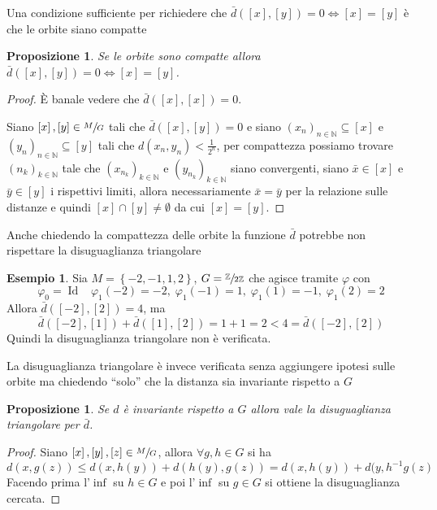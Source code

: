 \documentclass[a4paper,10pt]{article}
\newcounter{counter1}
\theoremstyle{plain}
\newtheorem{mypro}[counter1]{Proposizione}
\theoremstyle{definition}
\newtheorem{myes}[counter1]{Esempio}
\theoremstyle{remark}
\newcommand{\set}[1]{\left\{#1\right\}}
\newcommand{\pa}[1]{\left(#1\right)}
\newcommand{\bra}[1]{\left[#1\right]}
\DeclareMathOperator{\id}{Id}
\begin{document}
Una condizione sufficiente per richiedere che $\bar d (\bra{x} , \bra
{y} ) = 0 \Leftrightarrow \bra{x} = \bra{y}$ è che le orbite siano
compatte
\begin{mypro}
  Se le orbite sono compatte allora $\bar d (\bra{x},\bra{y}) = 0
  \Leftrightarrow \bra{x} = \bra{y}$.
\end{mypro}
\begin{proof}
  \`E banale vedere che $\bar d (\bra{x}, \bra{x} ) = 0$.

  Siano $\bra{x}, \bra{y} \in \sfrac{M}{G}$ tali che $\bar d
  (\bra{x},\bra{y}) = 0$ e siano $\pa{x_n}_ {n\in \mathbb{N}}
  \subseteq \bra{x}$ e $\pa{y_n}_ {n\in \mathbb{N}} \subseteq \bra{y}$
  tali che $d(x_n,y_n) < \frac{1}{2^n}$, per compattezza possiamo
  trovare $\pa{n_k} _{k\in \mathbb{N}}$ tale che $\pa{x_{n_k}}_{k\in
    \mathbb{N}}$ e $\pa{y_{n_k}}_{k\in \mathbb{N}}$ siano convergenti,
  siano $\bar x \in \bra{x}$ e $\bar y\in \bra{y}$ i rispettivi
  limiti, allora necessariamente $\bar x = \bar y$ per la relazione
  sulle distanze e quindi $\bra{x} \cap \bra{y} \neq \emptyset$ da cui
  $\bra{x} = \bra{y}$.
\end{proof}

Anche chiedendo la compattezza delle orbite la funzione $\bar d$
potrebbe non rispettare la disuguaglianza triangolare
\begin{myes}
  Sia $M = \set{ -2 , -1, 1, 2}$, $G =
  \sfrac{\mathbb{Z}}{2\mathbb{Z}}$ che agisce tramite $\varphi$ con
  \[ \varphi _0 = \id \;\;\; \varphi _1 (-2) = -2 ,\; \varphi _1 (-1)
  = 1 ,\; \varphi _1 (1) = -1 ,\; \varphi _1 (2) = 2 \]
  Allora $\bar d ( \bra{-2}, \bra{2}) = 4$, ma
  \[ \bar d (\bra{-2} , \bra{1} ) + \bar d (\bra{1} , \bra{2} ) = 1 + 1
  = 2 < 4 = \bar d ( \bra{-2}, \bra{2}) \]
  Quindi la disuguaglianza triangolare non è verificata.
\end{myes}

La disuguaglianza triangolare è invece verificata senza aggiungere
ipotesi sulle orbite ma chiedendo ``solo'' che la distanza sia
invariante rispetto a $G$
\begin{mypro}
  Se $d$ è invariante rispetto a $G$ allora vale la disuguaglianza
  triangolare per $\bar d$.
\end{mypro}
\begin{proof}
  Siano $\bra{x}, \bra{y}, \bra{z} \in \sfrac{M}{G}$, allora $\forall
  g,h \in G$ si ha
  \[ d(x,g(z)) \le d(x,h(y)) + d(h(y),g(z)) = d(x,h(y)) +
  d(y,h^{-1}g(z) \]
  Facendo prima l'$\inf$ su $h\in G$ e poi l'$\inf$ su $g \in G$ si
  ottiene la disuguaglianza cercata.
\end{proof}
\end{document}
